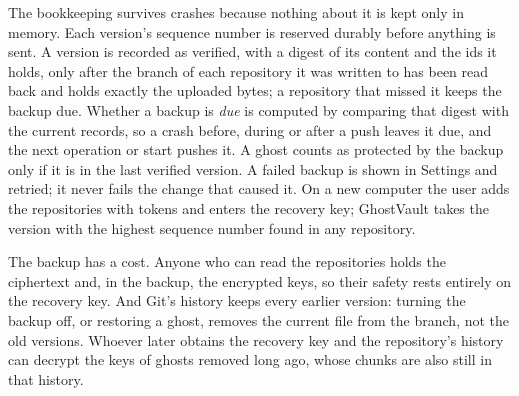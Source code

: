 The bookkeeping survives crashes because nothing about it is kept only in memory. Each version's
sequence number is reserved durably before anything is sent. A version is recorded as verified, with
a digest of its content and the ids it holds, only after the branch of each repository it was
written to has been read back and holds exactly the uploaded bytes; a repository that missed it
keeps the backup due. Whether a backup is \emph{due} is computed by comparing that digest with the
current records, so a crash before, during or after a push leaves it due, and the next operation or
start pushes it. A ghost counts as protected by the backup only if it is in the
last verified version. A failed backup is shown in Settings and retried; it never fails the change
that caused it. On a new computer the user adds the repositories with tokens and enters the recovery
key; GhostVault takes the version with the highest sequence number found in any repository.

The backup has a cost. Anyone who can read the repositories holds the ciphertext and, in the
backup, the encrypted keys, so their safety rests entirely on the recovery key. And Git's history
keeps every earlier version: turning the backup off, or restoring a ghost, removes the current file
from the branch, not the old versions. Whoever later obtains the recovery key and the repository's
history can decrypt the keys of ghosts removed long ago, whose chunks are also still in that history.


